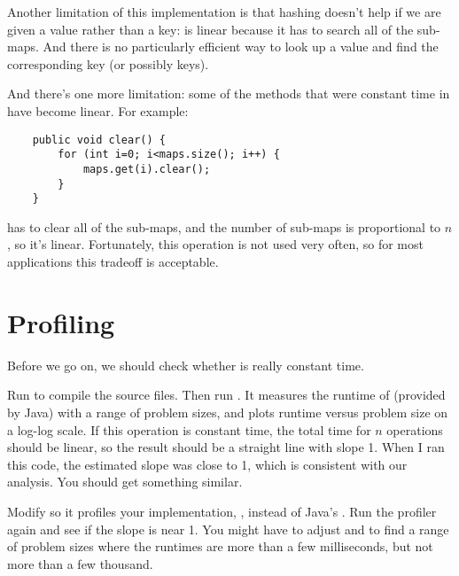 \documentclass[12pt]{book}
\theoremstyle{exercise}
\begin{document}

Another limitation of this implementation is that hashing doesn't help
if we are given a value rather than a key:  is
linear because it has to search all of the sub-maps. And there
is no particularly efficient way to look up a value and find the
corresponding key (or possibly keys).


And there's one more limitation: some of the methods that were constant
time in  have become linear. For example:

\begin{verbatim}
    public void clear() {
        for (int i=0; i<maps.size(); i++) {
            maps.get(i).clear();
        }
    }
\end{verbatim}

 has to clear all of the sub-maps, and the number of
sub-maps is proportional to $n$, so it's linear. Fortunately,
this operation is not used very often, so for most applications this
tradeoff is acceptable.



\section{Profiling }
\label{profiling-myhashmap}

Before we go on, we should check whether  is really
constant time.


Run  to compile the source
files. Then run . It measures the runtime of
 (provided by Java) with a range of problem sizes,
and plots runtime versus problem size on a log-log scale. If this
operation is constant time, the total time for $n$ operations
should be linear, so the result should be a straight line with slope
1. When I ran this code, the estimated slope was close to 1, which is
consistent with our analysis. You should get something similar.

Modify  so it profiles your implementation,
, instead of Java's . Run the
profiler again and see if the slope is near 1. You might have to
adjust  and  to find a range of
problem sizes where the runtimes are more than a few milliseconds, but
not more than a few thousand.
\end{document}
